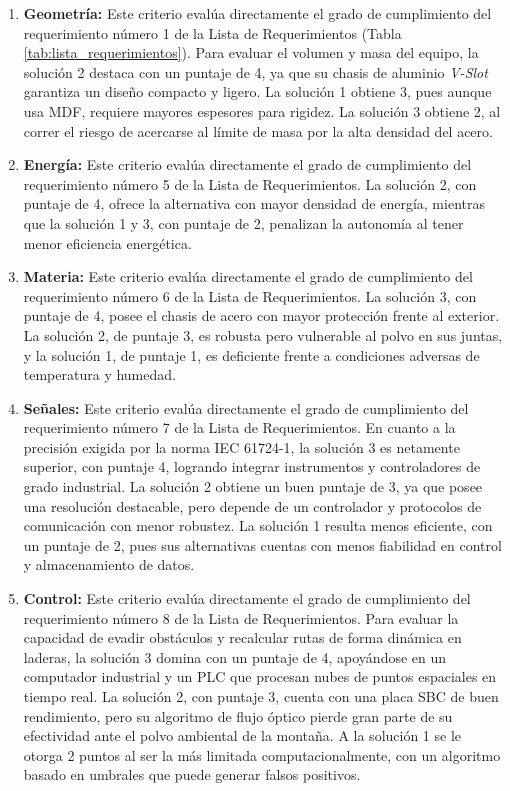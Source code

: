 \documentclass[../../General.tex]{subfiles}
\begin{document}
\begin{enumerate}
	\item \textbf{Geometría:} Este criterio evalúa directamente el grado de cumplimiento del requerimiento número 1 de la Lista de Requerimientos (Tabla  \ref{tab:lista_requerimientos}). 
	Para evaluar el volumen y masa del equipo, la solución 2 destaca con un puntaje de 4, ya que su chasis de aluminio \textit{V-Slot} garantiza un diseño compacto y ligero. La solución 1 obtiene 3, pues aunque usa MDF, requiere mayores espesores para rigidez. La solución 3 obtiene 2, al correr el riesgo de acercarse al límite de masa por la alta densidad del acero.
	\item \textbf{Energía:} Este criterio evalúa directamente el grado de cumplimiento del requerimiento número 5 de la Lista de Requerimientos.
	La solución 2, con puntaje de 4, ofrece la alternativa con mayor densidad de energía, mientras que la solución 1 y 3, con puntaje de 2, penalizan la autonomía al tener menor eficiencia energética.
	\item \textbf{Materia:} Este criterio evalúa directamente el grado de cumplimiento del requerimiento número 6 de la Lista de Requerimientos.
	La solución 3, con puntaje de 4, posee el chasis de acero con mayor protección frente al exterior. La solución 2, de puntaje 3, es robusta pero vulnerable al polvo en sus juntas, y la solución 1, de puntaje 1, es deficiente frente a condiciones adversas de temperatura y humedad.
	\item \textbf{Señales:} Este criterio evalúa directamente el grado de cumplimiento del requerimiento número 7 de la Lista de Requerimientos.
	En cuanto a la precisión exigida por la norma IEC 61724-1, la solución 3 es netamente superior, con puntaje 4, logrando integrar instrumentos y controladores de grado industrial. La solución 2 obtiene un buen puntaje de 3, ya que posee una resolución destacable, pero depende de un controlador y protocolos de comunicación con menor robustez. La solución 1 resulta menos eficiente, con un puntaje de 2, pues sus alternativas cuentas con menos fiabilidad en control y almacenamiento de datos.
	\item \textbf{Control:}  Este criterio evalúa directamente el grado de cumplimiento del requerimiento número 8 de la Lista de Requerimientos.
	Para evaluar la capacidad de evadir obstáculos y recalcular rutas de forma dinámica en laderas, la solución 3 domina con un puntaje de 4, apoyándose en un computador industrial y un PLC que procesan nubes de puntos espaciales en tiempo real. La solución 2, con puntaje 3, cuenta con una placa SBC de buen rendimiento, pero su algoritmo de flujo óptico pierde gran parte de su efectividad ante el polvo ambiental de la montaña. A la solución 1 se le otorga 2 puntos al ser la más limitada computacionalmente, con un algoritmo basado en umbrales que puede generar falsos positivos.
	

\end{enumerate}
\end{document}
